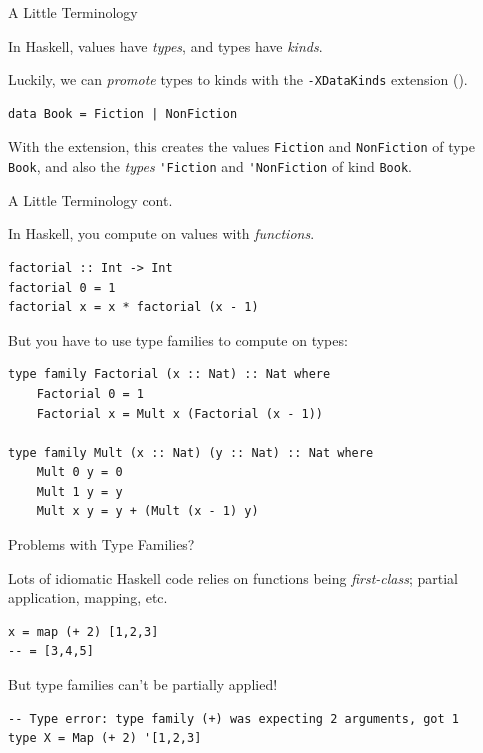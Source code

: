 \documentclass{beamer}
\newcommand{\inline}[1]{\lstinline[basicstyle=\ttfamily]{#1}}
\begin{document}
\begin{frame}[fragile]{A Little Terminology}

In Haskell, values have \emph{types}, and types have \emph{kinds}.

\pause

Luckily, we can \emph{promote} types to kinds with the \inline{-XDataKinds} extension (\cite{givingpromotion}).

\pause

\begin{lstlisting}
data Book = Fiction | NonFiction
\end{lstlisting}

With the extension, this creates the values \inline{Fiction} and \inline{NonFiction} of type \inline{Book}, and also the \emph{types} \inline{'Fiction} and \inline{'NonFiction} of kind \inline{Book}.

\end{frame}

\begin{frame}[fragile]{A Little Terminology cont.}

In Haskell, you compute on values with \emph{functions}.

\begin{lstlisting}
factorial :: Int -> Int
factorial 0 = 1
factorial x = x * factorial (x - 1)
\end{lstlisting}

\pause

But you have to use type families to compute on types:

\begin{lstlisting}
type family Factorial (x :: Nat) :: Nat where
    Factorial 0 = 1
    Factorial x = Mult x (Factorial (x - 1))
    
type family Mult (x :: Nat) (y :: Nat) :: Nat where
    Mult 0 y = 0
    Mult 1 y = y
    Mult x y = y + (Mult (x - 1) y)
\end{lstlisting}

\end{frame}

\begin{frame}[fragile]{Problems with Type Families?}

Lots of idiomatic Haskell code relies on functions being \emph{first-class}; partial application, mapping, etc.

\begin{lstlisting}
x = map (+ 2) [1,2,3]
-- = [3,4,5]
\end{lstlisting}

\pause

But type families can't be partially applied!

\begin{lstlisting}
-- Type error: type family (+) was expecting 2 arguments, got 1
type X = Map (+ 2) '[1,2,3]
\end{lstlisting}
    
\end{frame}
\end{document}
